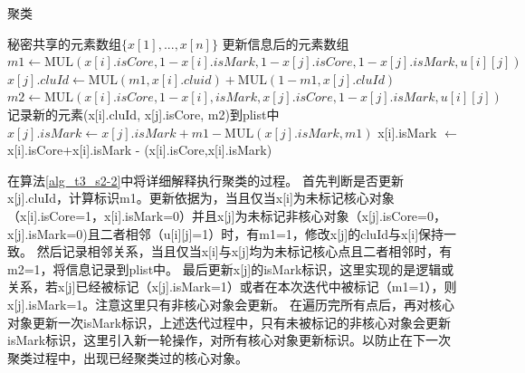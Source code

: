 \begin{algorithm}[htbp]
	\renewcommand{\algorithmicrequire}{\textbf{输入:}}
	\renewcommand{\algorithmicensure}{\textbf{输出:}}
	\caption{聚类}
	\label{alg_t3_s2-2} %
	\begin{algorithmic}[1]
		\REQUIRE 秘密共享的元素数组$ \{x[1],...,x[n]\} $
		\ENSURE 更新信息后的元素数组
		\STATE $ m1 \leftarrow \text{MUL}(x[i].isCore,1-x[i].isMark, 1- x[j].isCore, 1-x[j].isMark, u[i][j]) $
		\STATE $x[j].cluId \leftarrow \text{MUL}(m1, x[i].cluid) + \text{MUL}(1-m1, x[j].cluId)$
		\STATE $ m2 \leftarrow \text{MUL}(x[i].isCore, 1-x[i],isMark, x[j].isCore, 1-x[j].isMark, u[i][j]) $
		\STATE 记录新的元素(x[i].cluId, x[j].isCore, m2)到plist中
		\STATE $ x[j].isMark \leftarrow x[j].isMark + m1 - \text{MUL}(x[j].isMark, m1) $
		\ENDFOR
		\ENDFOR
		\STATE  x[i].isMark $ \leftarrow $ x[i].isCore+x[i].isMark - (x[i].isCore,x[i].isMark)
		\ENDFOR

	\end{algorithmic}
\end{algorithm}

在算法\ref{alg_t3_s2-2}中将详细解释执行聚类的过程。
首先判断是否更新x[j].cluId，计算标识m1。更新依据为，当且仅当x[i]为未标记核心对象（x[i].isCore=1，x[i].isMark=0）并且x[j]为未标记非核心对象（x[j].isCore=0，x[j].isMark=0)且二者相邻（u[i][j]=1）时，有m1=1，修改x[j]的cluId与x[i]保持一致。
然后记录相邻关系，当且仅当x[i]与x[j]均为未标记核心点且二者相邻时，有m2=1，将信息记录到plist中。
最后更新x[j]的isMark标识，这里实现的是逻辑或关系，若x[j]已经被标记（x[j].isMark=1）或者在本次迭代中被标记（m1=1），则x[j].isMark=1。注意这里只有非核心对象会更新。
在遍历完所有点后，再对核心对象更新一次isMark标识，上述迭代过程中，只有未被标记的非核心对象会更新isMark标识，这里引入新一轮操作，对所有核心对象更新标识。以防止在下一次聚类过程中，出现已经聚类过的核心对象。

